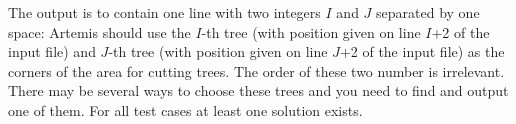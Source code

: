 The output is to contain one line with two integers $I$ and $J$ separated by one space: Artemis should use the $I$-th tree (with position given on line $I$+2 of the input file) and $J$-th tree (with position given on line $J$+2 of the input file) as the corners of the area for cutting trees. The order of these two number is irrelevant. There may be several ways to choose these trees and you need to find and output one of them. For all test cases at least one solution exists.